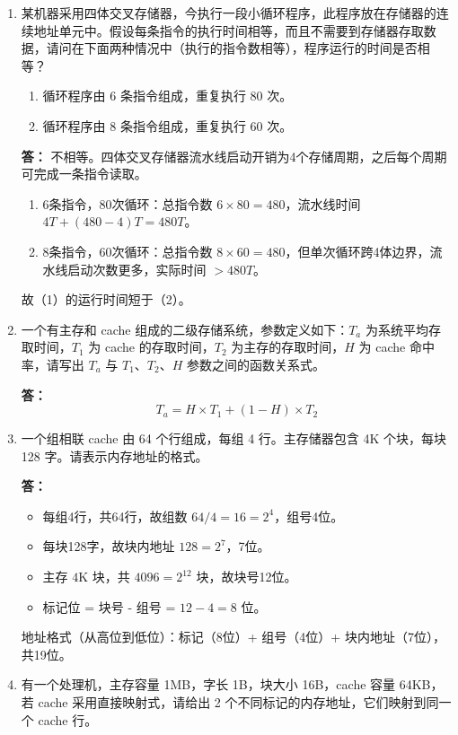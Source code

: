 \documentclass{article}
\begin{document}
\begin{enumerate}[label=\arabic*.]
    \item 某机器采用四体交叉存储器，今执行一段小循环程序，此程序放在存储器的连续地址单元中。假设每条指令的执行时间相等，而且不需要到存储器存取数据，请问在下面两种情况中（执行的指令数相等），程序运行的时间是否相等？
    \begin{enumerate}[label=(\arabic*)]
        \item 循环程序由 6 条指令组成，重复执行 80 次。
        \item 循环程序由 8 条指令组成，重复执行 60 次。
    \end{enumerate}
    
    \textbf{答：}
    不相等。四体交叉存储器流水线启动开销为4个存储周期，之后每个周期可完成一条指令读取。
    \begin{enumerate}[label=(\arabic*)]
        \item 6条指令，80次循环：总指令数 $6\times80=480$，流水线时间 $4T + (480-4)T = 480T$。
        \item 8条指令，60次循环：总指令数 $8\times60=480$，但单次循环跨4体边界，流水线启动次数更多，实际时间 $>480T$。
    \end{enumerate}
    故（1）的运行时间短于（2）。

    \item 一个有主存和 cache 组成的二级存储系统，参数定义如下：$T_a$ 为系统平均存取时间，$T_1$ 为 cache 的存取时间，$T_2$ 为主存的存取时间，$H$ 为 cache 命中率，请写出 $T_a$ 与 $T_1$、$T_2$、$H$ 参数之间的函数关系式。
    
    \textbf{答：}
    \[
    T_a = H \times T_1 + (1-H) \times T_2
    \]

    \item 一个组相联 cache 由 64 个行组成，每组 4 行。主存储器包含 4K 个块，每块 128 字。请表示内存地址的格式。
    
    \textbf{答：}
    \begin{itemize}
        \item 每组4行，共64行，故组数 $64/4=16=2^4$，组号4位。
        \item 每块128字，故块内地址 $128=2^7$，7位。
        \item 主存 $4\text{K}$ 块，共 $4096=2^{12}$ 块，故块号12位。
        \item 标记位 = 块号 - 组号 = $12-4=8$ 位。
    \end{itemize}
    地址格式（从高位到低位）：标记（8位）+ 组号（4位）+ 块内地址（7位），共19位。

    \item 有一个处理机，主存容量 1MB，字长 1B，块大小 16B，cache 容量 64KB，若 cache 采用直接映射式，请给出 2 个不同标记的内存地址，它们映射到同一个 cache 行。
    

\end{enumerate}
\end{document}
